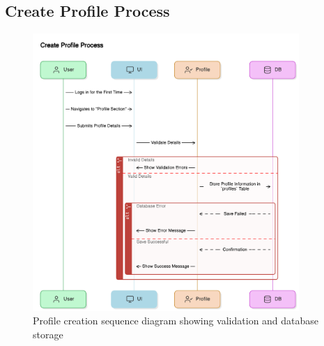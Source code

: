 \subsection{Create Profile Process}
\begin{figure}[H]
    \centering
    \includegraphics[width=0.9\textwidth]{images/sequence_diagrams/create_profile_process.png}
    \caption{Profile creation sequence diagram showing validation and database storage}
    \label{fig:create_profile}
\end{figure}

